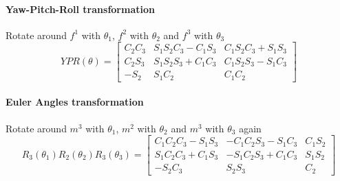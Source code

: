 \documentclass[12pt]{article}
\begin{document}
	\paragraph{Yaw-Pitch-Roll transformation} Rotate around $f^1$ with $\theta_{1}$, $f^2$ with $\theta_{2}$ and $f^3$ with $\theta_{3}$
	\begin{equation}
	YPR(\theta) = 
	\begin{bmatrix}
	C_{2} C_{3} & S_{1} S_{2} C_{3} - C_{1} S_{3} & C_{1} S_{2} C_{3} + S_{1} S_{3}\\
	C_{2} S_{3}  & S_{1} S_{2} S_{3} + C_{1} C_{3} & C_{1} S_{2} S_{3} - S_{1} C_{3}\\
	-S_{2} & S_{1} C_{2} & C_{1} C_{2}
	\end{bmatrix}
	\end{equation}
	
	\paragraph{Euler Angles transformation} Rotate around $m^3$ with $\theta_{1}$, $m^2$ with $\theta_{2}$ and $m^3$ with $\theta_{3}$ again
	\begin{equation}
	R_{3}(\theta_{1}) R_{2}(\theta_{2}) R_{3}(\theta_{3}) = 
	\begin{bmatrix}
	C_{1} C_{2} C_{3} - S_{1} S_{3} & -C_{1} C_{2} S_{3} - S_{1} C_{3} & C_{1} S_{2}\\
	S_{1} C_{2} C_{3} + C_{1} S_{3}  & -S_{1} C_{2} S_{3} + C_{1} C_{3} & S_{1} S_{2}\\
	-S_{2} C_{3} & S_{2} S_{3} & C_{2}
	\end{bmatrix}
	\end{equation}
	
\end{document}
